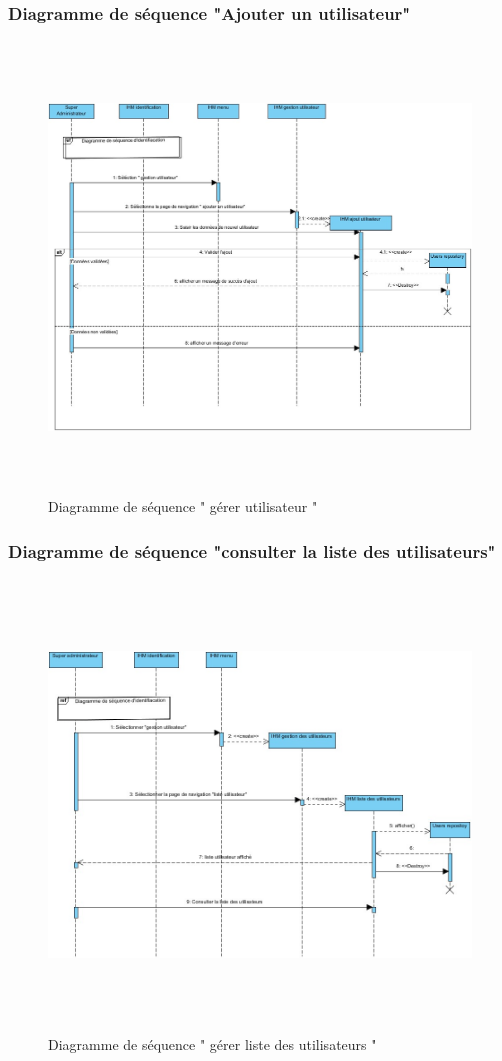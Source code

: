 \documentclass{article}
\begin{document}
\subsubsection{Diagramme de séquence "Ajouter un utilisateur"}
\begin{figure}[H]
\centering
\includegraphics[height=4.7in]{DiagSeqAjouterUtilisateur.jpg}
\caption[Figure11 : Diagramme de séquence " gérer utilisateur "]{Diagramme de séquence " gérer utilisateur "}
\label{fig:pic11}
\end{figure}
\subsubsection{Diagramme de séquence "consulter la liste des utilisateurs"}
\begin{figure}[H]
\centering
\includegraphics[height=4.7in]{DiagSeq2.jpg}
\caption[Figure12 : Diagramme de séquence " gérer liste des utilisateurs "]{Diagramme de séquence " gérer liste des utilisateurs "}
\label{fig:pic12}
\end{figure}
\end{document}
